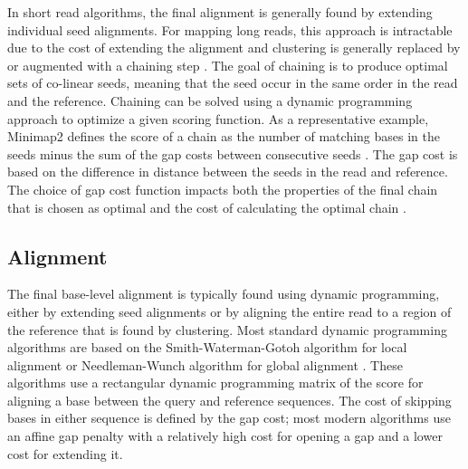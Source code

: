 \documentclass[11pt]{ucscthesis}
\begin{document}
In short read algorithms, the final alignment is generally found by extending individual seed alignments.
For mapping long reads, this approach is intractable due to the cost of extending the alignment and clustering is generally replaced by or augmented with a chaining step \cite{lr_review_2023}. 
The goal of chaining is to produce optimal sets of co-linear seeds, meaning that the seed occur in the same order in the read and the reference.
Chaining can be solved using a dynamic programming approach to optimize a given scoring function.
As a representative example, Minimap2 defines the score of a chain as the number of matching bases in the seeds minus the sum of the gap costs between consecutive seeds \cite{li_minimap2_2018}.
The gap cost is based on the difference in distance between the seeds in the read and reference.
The choice of gap cost function impacts both the properties of the final chain that is chosen as optimal and the cost of calculating the optimal chain \cite{lr_review_2023}. 

\subsection{Alignment}

The final base-level alignment is typically found using dynamic programming, either by extending seed alignments or by aligning the entire read to a region of the reference that is found by clustering.
Most standard dynamic programming algorithms are based on the Smith-Waterman-Gotoh algorithm for local alignment \cite{smith_waterman_1981,gotoh_1982} or Needleman-Wunch algorithm for global alignment \cite{needleman_wunsch_1970}.
These algorithms use a rectangular dynamic programming matrix of the score for aligning a base between the query and reference sequences.
The cost of skipping bases in either sequence is defined by the gap cost; most modern algorithms use an affine gap penalty with a relatively high cost for opening a gap and a lower cost for extending it.
\end{document}
